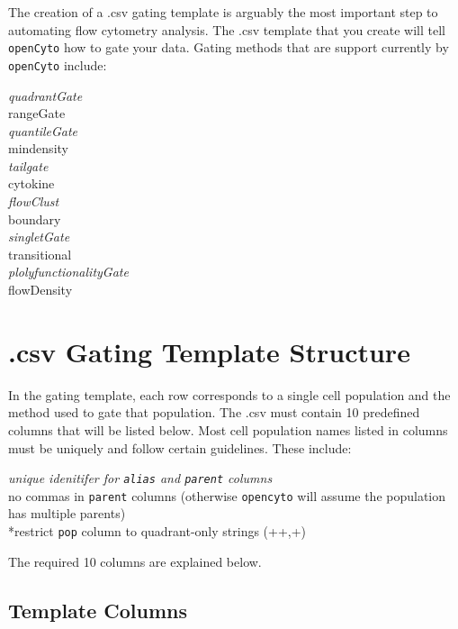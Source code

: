 \documentclass[]{book}
\begin{document}
The creation of a .csv gating template is arguably the most important step to automating flow cytometry analysis. The .csv template that you create will tell \texttt{openCyto} how to gate your data. Gating methods that are support currently by \texttt{openCyto} include:

\emph{quadrantGate\\
}rangeGate\\
\emph{quantileGate\\
}mindensity\\
\emph{tailgate\\
}cytokine\\
\emph{flowClust\\
}boundary\\
\emph{singletGate\\
}transitional\\
\emph{plolyfunctionalityGate\\
}flowDensity

\hypertarget{csv-gating-template-structure}{%
\section{.csv Gating Template Structure}\label{csv-gating-template-structure}}

In the gating template, each row corresponds to a single cell population and the method used to gate that population. The .csv must contain 10 predefined columns that will be listed below. Most cell population names listed in columns must be uniquely and follow certain guidelines. These include:

\emph{unique idenitifer for \texttt{alias} and \texttt{parent} columns\\
}no commas in \texttt{parent} columns (otherwise \texttt{opencyto} will assume the population has multiple parents)\\
*restrict \texttt{pop} column to quadrant-only strings (++,+)

The required 10 columns are explained below.

\hypertarget{template-columns}{%
\subsection{Template Columns}\label{template-columns}}
\end{document}
